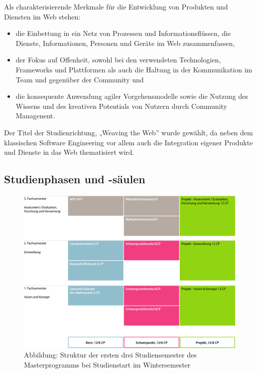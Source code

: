 Als charakterisierende Merkmale für die Entwicklung von Produkten und
Diensten im Web stehen:

\begin{itemize}
\item
  die Einbettung in ein Netz von Prozessen und Informationsflüssen, die
  Dienste, Informationen, Personen und Geräte im Web zusammenfassen,
\item
  der Fokus auf Offenheit, sowohl bei den verwendeten Technologien,
  Frameworks und Plattformen als auch die Haltung in der Kommunikation
  im Team und gegenüber der Community und
\item
  die konsequente Anwendung agiler Vorgehensmodelle sowie die Nutzung
  des Wissens und des kreativen Potentials von Nutzern durch Community
  Managenent.
\end{itemize}

Der Titel der Studienrichtung, „Weaving the Web'' wurde gewählt, da
neben dem klassischen Software Engineering vor allem auch die
Integration eigener Produkte und Dienste in das Web thematisiert wird.

\subsection{Studienphasen und
-säulen}\label{studienphasen-und--suxe4ulen-1}

\begin{figure}[htbp]
\centering
\includegraphics[width=\columnwidth]{../anhaenge/bilder/ma-struktur.pdf}
\caption{Abbildung: Struktur der ersten drei Studiensemester des
Masterprogramms bei Studienstart im Wintersemester}
\end{figure}

